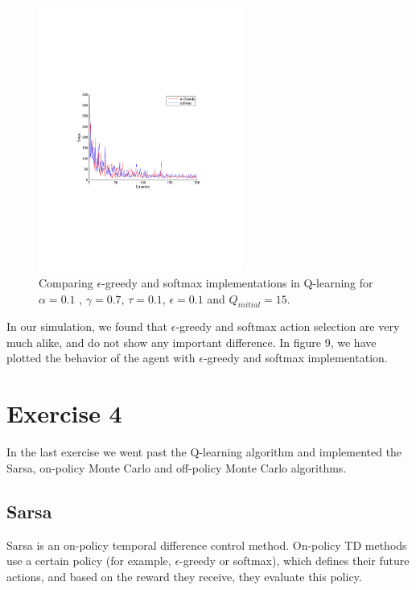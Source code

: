 \documentclass[a4paper,11pt]{article}
\begin{document}
\begin{figure}[b!]
  \centering
    \includegraphics[trim=4cm 8.5cm 4cm 8.5cm,clip,width=0.6\textwidth]{figures/egresoftcomp.pdf}
    \caption{Comparing $\epsilon$-greedy and softmax implementations in Q-learning for $\alpha = 0.1$ , $\gamma = 0.7$, $\tau = 0.1$, $\epsilon = 0.1$ and $Q_{initial} = 15$.}
    \label{egresoftcomp}
\end{figure}

In our simulation, we found that $\epsilon$-greedy and softmax action selection are very much alike, and do not show any important difference. In figure 9, we have plotted the behavior of the agent with $\epsilon$-greedy and softmax implementation.













\section*{Exercise 4}
In the last exercise we went past the Q-learning algorithm and implemented the Sarsa, on-policy Monte Carlo and off-policy Monte Carlo algorithms. 	
\subsection*{Sarsa}
Sarsa is an on-policy temporal difference control method. On-policy TD methods use a certain policy (for example, $\epsilon$-greedy or softmax), which defines their future actions, and based on the reward they receive, they evaluate this policy.
\end{document}
